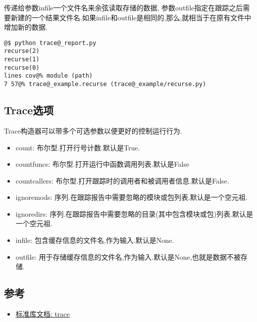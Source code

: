 \documentclass[a4paper,10pt,english]{manual}
\begin{document}
传递给参数infile一个文件名来余弦读取存储的数据, 参数outfile指定在跟踪之后需要新建的一个结果文件名.如果infile和outfile是相同的,那么,就相当于在原有文件中增加新的数据.

\begin{Verbatim}[commandchars=@\[\]]
@$ python trace@_report.py
recurse(2)
recurse(1)
recurse(0)
lines cov@% module (path)
7 57@% trace@_example.recurse (trace@_example/recurse.py)
\end{Verbatim}


\subsection{Trace选项}

Trace构造器可以带多个可选参数以便更好的控制运行行为.
\begin{itemize}
\item {} 
count:        布尔型.打开行号计数.默认是True.

\item {} 
countfuncs:   布尔型.打开运行中函数调用列表.默认是False

\item {} 
countcallers: 布尔型.打开跟踪时的调用者和被调用者信息.默认是False.

\item {} 
ignoremods:   序列.在跟踪报告中需要忽略的模块或包列表.默认是一个空元祖.

\item {} 
ignoredirs:   序列.在跟踪报告中需要忽略的目录(其中包含模块或包)列表.默认是一个空元祖.

\item {} 
infile:       包含缓存信息的文件名,作为输入.默认是None.

\item {} 
outfile:      用于存储缓存信息的文件名,作为输入.默认是None,也就是数据不被存储.

\end{itemize}


\subsection{参考}
\begin{itemize}
\item {} 
\href{http://docs.python.org/library/trace.html}{标准库文档: trace}

\end{itemize}

\resetcurrentobjects
\end{document}
